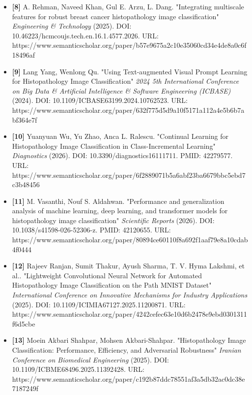 \documentclass[10pt]{article}
\begin{document}
\begin{itemize}
\item \textbf{[8]} A. Rehman, Naveed Khan, Gul E. Arzu, L. Dang. "Integrating multiscale features for robust breast cancer histopathology image classification" \emph{Engineering \& Technology} (2025). DOI: 10.46223/hcmcoujs.tech.en.16.1.4577.2026. URL: https://www.semanticscholar.org/paper/b57e9675\allowbreak{}a2c10e35\allowbreak{}060cd34e\allowbreak{}4de8a0c6\allowbreak{}f18496af
\item \textbf{[9]} Lang Yang, Wenlong Qu. "Using Text-augmented Visual Prompt Learning for Histopathology Image Classification" \emph{2024 5th International Conference on Big Data \& Artificial Intelligence \& Software Engineering (ICBASE)} (2024). DOI: 10.1109/ICBASE63199.2024.10762523. URL: https://www.semanticscholar.org/paper/632f775d\allowbreak{}5d9a10f5\allowbreak{}171a112a\allowbreak{}4e5b6b7a\allowbreak{}bf364e7f
\item \textbf{[10]} Yuanyuan Wu, Yu Zhao, Anca L. Ralescu. "Continual Learning for Histopathology Image Classification in Class-Incremental Learning" \emph{Diagnostics} (2026). DOI: 10.3390/diagnostics16111711. PMID: 42279577. URL: https://www.semanticscholar.org/paper/6f288907\allowbreak{}1b5a6abf\allowbreak{}23ba6679\allowbreak{}bbc5ebd7\allowbreak{}c3b48456
\item \textbf{[11]} M. Vasanthi, Nouf S. Aldahwan. "Performance and generalization analysis of machine learning, deep learning, and transformer models for histopathology image classification" \emph{Scientific Reports} (2026). DOI: 10.1038/s41598-026-52306-z. PMID: 42120655. URL: https://www.semanticscholar.org/paper/80894ce6\allowbreak{}0110f8a6\allowbreak{}92f1aaf7\allowbreak{}9e8a10cd\allowbreak{}ab4f0444
\item \textbf{[12]} Rajeev Ranjan, Sumit Thakur, Ayush Sharma, T. V. Hyma Lakshmi, et al.. "Lightweight Convolutional Neural Network for Automated Histopathology Image Classification on the Path MNIST Dataset" \emph{International Conference on Innovative Mechanisms for Industry Applications} (2025). DOI: 10.1109/ICIMIA67127.2025.11200871. URL: https://www.semanticscholar.org/paper/4242cefe\allowbreak{}c63e10d6\allowbreak{}b2478e9e\allowbreak{}bd030131\allowbreak{}1f6d5cbe
\item \textbf{[13]} Moein Akbari Shahpar, Mohsen Akbari-Shahpar. "Histopathology Image Classification: Performance, Efficiency, and Adversarial Robustness" \emph{Iranian Conference on Biomedical Engineering} (2025). DOI: 10.1109/ICBME68496.2025.11392428. URL: https://www.semanticscholar.org/paper/c192b87d\allowbreak{}dc78551a\allowbreak{}f3a5db32\allowbreak{}ac0dc38e\allowbreak{}7187249f

\end{itemize}
\end{document}
